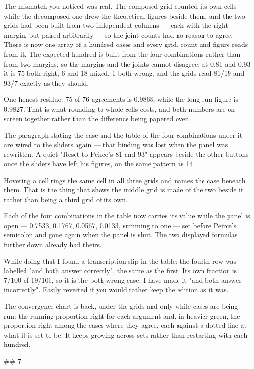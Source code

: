 The mismatch you noticed was real. The composed grid counted its own cells while
the decomposed one drew the theoretical figures beside them, and the two grids
had been built from two independent columns — each with the right margin, but
paired arbitrarily — so the joint counts had no reason to agree. There is now
one array of a hundred cases and every grid, count and figure reads from it. The
expected hundred is built from the four combinations rather than from two
margins, so the margins and the joints cannot disagree: at 0.81 and 0.93 it is
75 both right, 6 and 18 mixed, 1 both wrong, and the grids read 81/19 and 93/7
exactly as they should.

One honest residue: 75 of 76 agreements is 0.9868, while the long-run figure is
0.9827. That is what rounding to whole cells costs, and both numbers are on
screen together rather than the difference being papered over.

The paragraph stating the case and the table of the four combinations under it
are wired to the sliders again — that binding was lost when the panel was
rewritten. A quiet "Reset to Peirce's 81 and 93" appears beside the other
buttons once the sliders have left his figures, on the same pattern as 14.

Hovering a cell rings the same cell in all three grids and names the case
beneath them. That is the thing that shows the middle grid is made of the two
beside it rather than being a third grid of its own.

Each of the four combinations in the table now carries its value while the panel
is open — 0.7533, 0.1767, 0.0567, 0.0133, summing to one — set before Peirce's
semicolon and gone again when the panel is shut. The two displayed formulas
further down already had theirs.

While doing that I found a transcription slip in the table: the fourth row was
labelled "and both answer correctly", the same as the first. Its own fraction is
7/100 of 19/100, so it is the both-wrong case; I have made it "and both answer
incorrectly". Easily reverted if you would rather keep the edition as it was.

The convergence chart is back, under the grids and only while cases are being
run: the running proportion right for each argument and, in heavier green, the
proportion right among the cases where they agree, each against a dotted line
at what it is set to be. It keeps growing across sets rather than restarting
with each hundred.


## 7

